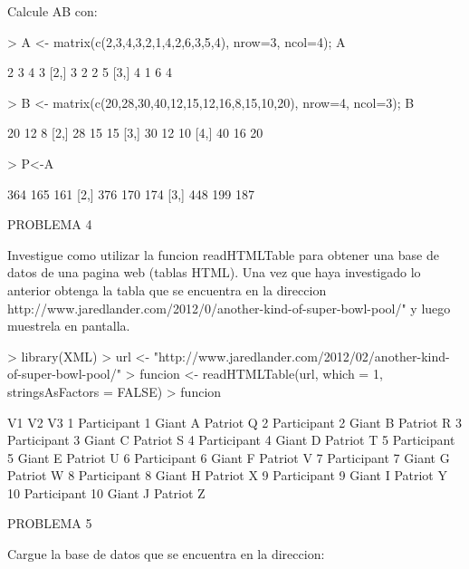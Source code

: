\documentclass{article}
\begin{document}
Calcule AB con:
\begin{Schunk}
\begin{Sinput}
> A <- matrix(c(2,3,4,3,2,1,4,2,6,3,5,4), nrow=3, ncol=4); A
\end{Sinput}
\begin{Soutput}
     [,1] [,2] [,3] [,4]
[1,]    2    3    4    3
[2,]    3    2    2    5
[3,]    4    1    6    4
\end{Soutput}
\begin{Sinput}
> B <- matrix(c(20,28,30,40,12,15,12,16,8,15,10,20), nrow=4, ncol=3); B
\end{Sinput}
\begin{Soutput}
     [,1] [,2] [,3]
[1,]   20   12    8
[2,]   28   15   15
[3,]   30   12   10
[4,]   40   16   20
\end{Soutput}
\begin{Sinput}
>  P<-A %*%B;P
\end{Sinput}
\begin{Soutput}
     [,1] [,2] [,3]
[1,]  364  165  161
[2,]  376  170  174
[3,]  448  199  187
\end{Soutput}
\end{Schunk}
PROBLEMA 4

Investigue como utilizar la funcion readHTMLTable para obtener una base de datos de una pagina web (tablas HTML). Una vez que haya investigado lo anterior obtenga la tabla que se encuentra en la direccion http://www.jaredlander.com/2012/0/another-kind-of-super-bowl-pool/" y luego muestrela en pantalla.
\begin{Schunk}
\begin{Sinput}
> library(XML)
> url <- "http://www.jaredlander.com/2012/02/another-kind-of-super-bowl-pool/" 
> funcion <- readHTMLTable(url, which = 1, stringsAsFactors = FALSE)
> funcion
\end{Sinput}
\begin{Soutput}
               V1      V2        V3
1   Participant 1 Giant A Patriot Q
2   Participant 2 Giant B Patriot R
3   Participant 3 Giant C Patriot S
4   Participant 4 Giant D Patriot T
5   Participant 5 Giant E Patriot U
6   Participant 6 Giant F Patriot V
7   Participant 7 Giant G Patriot W
8   Participant 8 Giant H Patriot X
9   Participant 9 Giant I Patriot Y
10 Participant 10 Giant J Patriot Z
\end{Soutput}
\end{Schunk}
PROBLEMA 5

Cargue la base de datos que se encuentra en la direccion:
\end{document}
